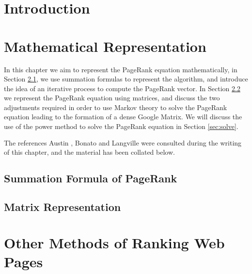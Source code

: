 \documentclass[11pt]{report}
\begin{document}
\tableofcontents
\newpage
\listoffigures
\listoftables


\printnomenclature[5em]

\chapter{Introduction}\label{chap:import}

\chapter{Mathematical Representation} \label{chap:Math}
In this chapter we aim to represent the PageRank equation mathematically, in Section \ref{sec:summ}, we use summation formulas to represent the algorithm, and introduce the idea of an iterative process to compute the PageRank vector. In Section \ref{sec:matrix} we represent the PageRank equation using matrices, and discuss the two adjustments required in order to use Markov theory to solve the PageRank equation leading to the formation of a dense Google Matrix. We will discuss the use of the power method to solve the PageRank equation in Section \ref{sec:solve}.

The references Austin \cite{austin}, Bonato \cite{bonato} and Langville \cite{langville} were consulted during the writing of this chapter, and the material has been collated below.  

\section{Summation Formula of PageRank} \label{sec:summ}


\section{Matrix Representation} \label{sec:matrix}


\chapter{Other Methods of Ranking Web Pages}\label{chap:Other}
\end{document}
